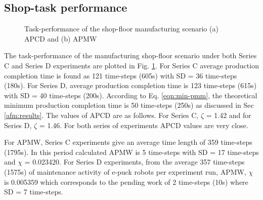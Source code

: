 \subsection*{Shop-task performance}
\begin{figure}[H]
\centering
\hspace*{0.5cm}
\newline
{}
\caption{\small Task-performance of the shop-floor manufacturing scenario (a) APCD and (b) APMW}
\label{fig:vms-SC-SD} 
\end{figure}
The task-performance of the manufacturing shop-floor scenario under both Series C and Series D experiments are plotted in Fig. \ref{fig:vms-SC-SD}. For Series C  average production completion time is found as 121 time-steps (605s) with SD = 36 time-steps (180s). For Series D,  average production completion time is 123 time-steps (615s) with SD = 40 time-steps (200s). According to Eq. \ref{eqn:min-pmm}, the theoretical minimum production completion time is 50 time-steps (250s) as discussed in Sec \ref{afm:results}.  The values of APCD are as follows. For Series C, $\zeta$ = 1.42 and for Series D, $\zeta$ = 1.46. For both series of experiments APCD values are very close.

For APMW, Series C experiments give an average time length of 359 time-steps (1795s). In this period  calculated APMW is 5 time-steps with SD = 17 time-steps and $\chi$ = 0.023420. For Series D experiments, from the average 357 time-steps (1575s) of maintenance activity of e-puck robots per experiment run, APMW, $\chi$ is 0.005359 which corresponds to the pending work of 2 time-steps (10s) where SD = 7 time-steps.
